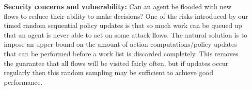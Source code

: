\documentclass[10pt, times, comsoc]{IEEEtran}
\newcommand{\fakepara}[1]{\noindent\textbf{#1:}}
\begin{document}
\fakepara{Security concerns and vulnerability}
Can an agent be flooded with new flows to reduce their ability to make decisions?
One of the risks introduced by our timed random sequential policy updates is that so much work can be queued up that an agent is never able to act on some attack flows.
The natural solution is to impose an upper bound on the amount of action computations/policy updates that can be performed before a work list is discarded completely.
This removes the guarantee that all flows will be visited fairly often, but if updates occur regularly then this random sampling may be sufficient to achieve good performance.

%	
%
%	
\end{document}
